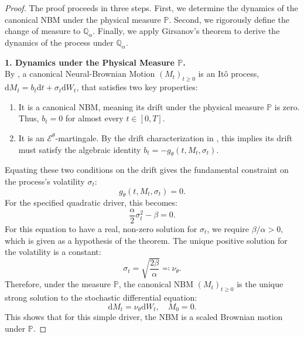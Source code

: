 \documentclass[qian]{imsart}
\newcommand{\Qbb}{\mathbb{Q}}
\newcommand{\Prob}{\mathbb{P}}
\newcommand{\cEneutheta}{\mathcal{E}^{\theta}}
\newcommand{\dd}{\mathrm{d}}
\theoremstyle{plain}
\theoremstyle{definition}
\begin{document}
\begin{proof}
The proof proceeds in three steps. First, we determine the dynamics of the canonical NBM under the physical measure $\Prob$. Second, we rigorously define the change of measure to $\Qbb_\alpha$. Finally, we apply Girsanov's theorem to derive the dynamics of the process under $\Qbb_\alpha$.

\noindent\textbf{1. Dynamics under the Physical Measure $\Prob$.}\\
By , a canonical Neural-Brownian Motion $(M_t)_{t \ge 0}$ is an Itô process, $\dd M_t = b_t \dd t + \sigma_t \dd W_t$, that satisfies two key properties:
\begin{enumerate}[label=(\alph*)]
    \item It is a canonical NBM, meaning its drift under the physical measure $\Prob$ is zero. Thus, $b_t = 0$ for almost every $t \in [0,T]$.
    \item It is an $\cEneutheta$-martingale. By the drift characterization in , this implies its drift must satisfy the algebraic identity $b_t = -g_\theta(t, M_t, \sigma_t)$.
\end{enumerate}
Equating these two conditions on the drift gives the fundamental constraint on the process's volatility $\sigma_t$:
\[
    g_\theta(t, M_t, \sigma_t) = 0.
\]
For the specified quadratic driver, this becomes:
\[
    \frac{\alpha}{2}\sigma_t^2 - \beta = 0.
\]
For this equation to have a real, non-zero solution for $\sigma_t$, we require $\beta/\alpha > 0$, which is given as a hypothesis of the theorem. The unique positive solution for the volatility is a constant:
\[
    \sigma_t = \sqrt{\frac{2\beta}{\alpha}} \eqqcolon \nu_\theta.
\]
Therefore, under the measure $\Prob$, the canonical NBM $(M_t)_{t\ge 0}$ is the unique strong solution to the stochastic differential equation:
\[
    \dd M_t = \nu_\theta \dd W_t, \quad M_0 = 0.
\]
This shows that for this simple driver, the NBM is a scaled Brownian motion under $\Prob$.


\end{proof}
\end{document}
